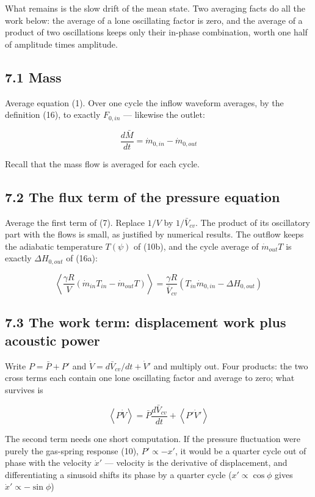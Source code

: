 \documentclass[11pt]{article}
\begin{document}
What remains is the slow drift of the mean state. Two averaging facts do all the work below: the average of a lone oscillating factor is zero, and the average of a product of two oscillations keeps only their in-phase combination, worth one half of amplitude times amplitude.

\subsection*{7.1 Mass}

Average equation (1). Over one cycle the inflow waveform averages, by the definition (16), to exactly $F_{0,in}$ --- likewise the outlet:

\begin{equation}
\frac{d\bar M}{dt} = \dot m_{0,in} - \dot m_{0,out} \tag{23}
\end{equation}

Recall that the mass flow is averaged for each cycle.

\subsection*{7.2 The flux term of the pressure equation}

Average the first term of (7). Replace $1/V$ by $1/\bar V_{cv}$. The product of its oscillatory part with the flows is small, as justified by numerical results. The outflow keeps the adiabatic temperature $T(\psi)$ of (10b), and the cycle average of $\dot m_{out}T$ is exactly $\Delta H_{0,out}$ of (16a):

\[
\left\langle\frac{\gamma R}{V}\left(\dot m_{in}T_{in} - \dot m_{out}T\right)\right\rangle = \frac{\gamma R}{\bar V_{cv}}\left(T_{in}\dot m_{0,in} - \Delta H_{0,out}\right)
\]

\subsection*{7.3 The work term: displacement work plus acoustic power}

Write $P = \bar P + P'$ and $\dot V = d\bar V_{cv}/dt + \dot V'$ and multiply out. Four products: the two cross terms each contain one lone oscillating factor and average to zero; what survives is

\[
\left\langle P\dot V\right\rangle = \bar P\frac{d\bar V_{cv}}{dt} + \left\langle P'\dot V'\right\rangle
\]

The second term needs one short computation. If the pressure fluctuation were purely the gas-spring response (10), $P' \propto -x'$, it would be a quarter cycle out of phase with the velocity $\dot x'$ --- velocity is the derivative of displacement, and differentiating a sinusoid shifts its phase by a quarter cycle ($x' \propto \cos\phi$ gives $\dot x' \propto -\sin\phi$)
\end{document}
